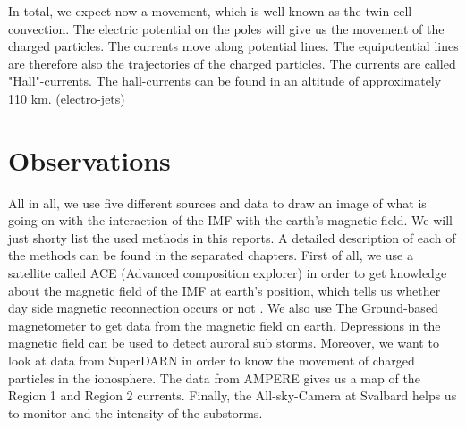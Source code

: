 \documentclass[10pt,a4paper]{article}
\begin{document}
In total, we expect now a movement, which is well known as the twin cell convection. The electric potential on the poles will give us the movement of the 
charged particles. The currents move along potential lines. The equipotential lines are therefore also the trajectories of the charged particles. 
The currents are called "Hall"-currents. The hall-currents can be found in an altitude of approximately 110 km. (electro-jets)


\section{Observations}

All in all, we use five different sources and data to draw an image of what is going on with the interaction of the IMF with the earth's magnetic field. We will just shorty list the used methods in this reports. A detailed description of each of the methods can be found in the separated chapters. 
First of all, we use a satellite called ACE (Advanced composition explorer) in order to get knowledge about the magnetic field of the IMF at earth's position, which tells us whether day side magnetic reconnection occurs or not . 
We also use The Ground-based magnetometer to get data from the magnetic field on earth. Depressions in the magnetic field can be used to detect auroral sub storms. 
Moreover, we want to look at data from SuperDARN in order to know the movement of charged particles in the ionosphere.
The data from AMPERE gives us a map of the Region 1 and Region 2 currents. Finally, the All-sky-Camera at Svalbard helps us to monitor and the intensity of the substorms.  
\end{document}

